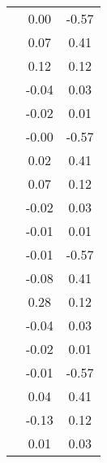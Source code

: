 \begin{table}
\begin{tabular}{c|cc|}
\multicolumn{1}{|c|}{} & \multicolumn{1}{|c|}{      0.00} & \multicolumn{1}{|c|}{     -0.57} \\ 
\multicolumn{1}{|c|}{} & \multicolumn{1}{|c|}{      0.07} & \multicolumn{1}{|c|}{      0.41} \\ 
\multicolumn{1}{|c|}{} & \multicolumn{1}{|c|}{      0.12} & \multicolumn{1}{|c|}{      0.12} \\ 
\multicolumn{1}{|c|}{} & \multicolumn{1}{|c|}{     -0.04} & \multicolumn{1}{|c|}{      0.03} \\ 
\multicolumn{1}{|c|}{} & \multicolumn{1}{|c|}{     -0.02} & \multicolumn{1}{|c|}{      0.01} \\ 
\multicolumn{1}{|c|}{} & \multicolumn{1}{|c|}{     -0.00} & \multicolumn{1}{|c|}{     -0.57} \\ 
\multicolumn{1}{|c|}{} & \multicolumn{1}{|c|}{      0.02} & \multicolumn{1}{|c|}{      0.41} \\ 
\multicolumn{1}{|c|}{} & \multicolumn{1}{|c|}{      0.07} & \multicolumn{1}{|c|}{      0.12} \\ 
\multicolumn{1}{|c|}{} & \multicolumn{1}{|c|}{     -0.02} & \multicolumn{1}{|c|}{      0.03} \\ 
\multicolumn{1}{|c|}{} & \multicolumn{1}{|c|}{     -0.01} & \multicolumn{1}{|c|}{      0.01} \\ 
\multicolumn{1}{|c|}{} & \multicolumn{1}{|c|}{     -0.01} & \multicolumn{1}{|c|}{     -0.57} \\ 
\multicolumn{1}{|c|}{} & \multicolumn{1}{|c|}{     -0.08} & \multicolumn{1}{|c|}{      0.41} \\ 
\multicolumn{1}{|c|}{} & \multicolumn{1}{|c|}{      0.28} & \multicolumn{1}{|c|}{      0.12} \\ 
\multicolumn{1}{|c|}{} & \multicolumn{1}{|c|}{     -0.04} & \multicolumn{1}{|c|}{      0.03} \\ 
\multicolumn{1}{|c|}{} & \multicolumn{1}{|c|}{     -0.02} & \multicolumn{1}{|c|}{      0.01} \\ 
\multicolumn{1}{|c|}{} & \multicolumn{1}{|c|}{     -0.01} & \multicolumn{1}{|c|}{     -0.57} \\ 
\multicolumn{1}{|c|}{} & \multicolumn{1}{|c|}{      0.04} & \multicolumn{1}{|c|}{      0.41} \\ 
\multicolumn{1}{|c|}{} & \multicolumn{1}{|c|}{     -0.13} & \multicolumn{1}{|c|}{      0.12} \\ 
\multicolumn{1}{|c|}{} & \multicolumn{1}{|c|}{      0.01} & \multicolumn{1}{|c|}{      0.03} \\ 

\end{tabular}
\end{table}
